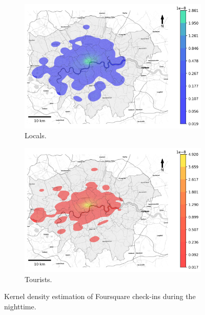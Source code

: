 \documentclass{article}
\theoremstyle{definition}
\theoremstyle{remark}
\begin{document}
\begin{figure}[!h]

\begin{subfigure}{0.5\textwidth}
\includegraphics[width=1\linewidth]{figures/kde_locals_nighttime.png} 
\caption{Locals.}
\label{fig:kde_locals_nighttime}
\end{subfigure}
\begin{subfigure}{0.5\textwidth}
\includegraphics[width=1\linewidth]{figures/kde_tourists_nighttime.png}
\caption{Tourists.}
\label{fig:kde_tourists_nighttime}
\end{subfigure}

\caption{Kernel density estimation of Foursquare check-ins during the nighttime.} \label{fig:kde_nighttime}
\end{figure}
\end{document}

